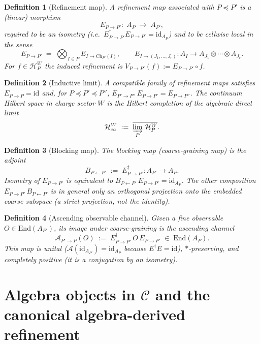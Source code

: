 \documentclass[11pt,a4paper]{article}
\newtheorem{definition}{Definition}[section]
\theoremstyle{definition}
\newcommand{\Cc}{\mathcal{C}}
\newcommand{\Hh}{\mathcal{H}}
\newcommand{\Aa}{\mathcal{A}}
\newcommand{\End}{\mathrm{End}}
\newcommand{\id}{\mathrm{id}}
\begin{document}
\begin{definition}[Refinement map]\label{def:refmap}
A \emph{refinement map} associated with $P\preceq P'$ is a (linear)
morphism
\[
E_{P\to P'}:\; A_P \;\longrightarrow\; A_{P'},
\]
required to be an \emph{isometry} (i.e.\ $E_{P\to P'}^{\dagger} E_{P\to P'} = \id_{A_P}$)
and to be \emph{cellwise local} in the sense
\[
E_{P\to P'} \;=\; \bigotimes_{I\in P} E_{I\to\mathrm{Ch}_{P'}(I)},
\qquad
E_{I\to(J_1,\dots,J_r)}: A_I \to A_{J_1}\otimes\cdots\otimes A_{J_r}.
\]
For $f\in\Hh_P^{W}$ the induced refinement is $V_{P\to P'}(f) := E_{P\to P'}\circ f$.
\end{definition}

\begin{definition}[Inductive limit]\label{def:indlim}
A \emph{compatible family} of refinement maps satisfies
$E_{P\to P} = \id$ and, for $P\preceq P'\preceq P''$,
$E_{P'\to P''}\,E_{P\to P'} = E_{P\to P''}$. The \emph{continuum Hilbert
space in charge sector $W$} is the Hilbert completion of the algebraic
direct limit
\[
\Hh_\infty^{W} \;:=\; \overline{\varinjlim_{P}\,\Hh_P^{W}}.
\]
\end{definition}

\begin{definition}[Blocking map]\label{def:blocking}
The \emph{blocking map} (\emph{coarse-graining map}) is the adjoint
\[
B_{P\leftarrow P'} \;:=\; E_{P\to P'}^{\dagger}: A_{P'} \to A_P.
\]
Isometry of $E_{P\to P'}$ is equivalent to
$B_{P\leftarrow P'}\,E_{P\to P'} = \id_{A_P}$. The other composition
$E_{P\to P'}\,B_{P\leftarrow P'}$ is in general only an orthogonal projection
onto the embedded coarse subspace (a strict projection, not the identity).
\end{definition}

\begin{definition}[Ascending observable channel]\label{def:ascending}
Given a fine observable $O\in\End(A_{P'})$, its image under coarse-graining
is the \emph{ascending channel}
\[
\Aa_{P'\to P}(O) \;:=\; E_{P\to P'}^{\dagger}\,O\,E_{P\to P'} \;\in\; \End(A_P).
\]
This map is unital ($\Aa(\id_{A_{P'}}) = \id_{A_P}$ because $E^\dagger E = \id$),
$\ast$-preserving, and completely positive (it is a conjugation by an isometry).
\end{definition}

\section{Algebra objects in $\Cc$ and the canonical algebra-derived refinement}\label{sec:algobj}
\end{document}
